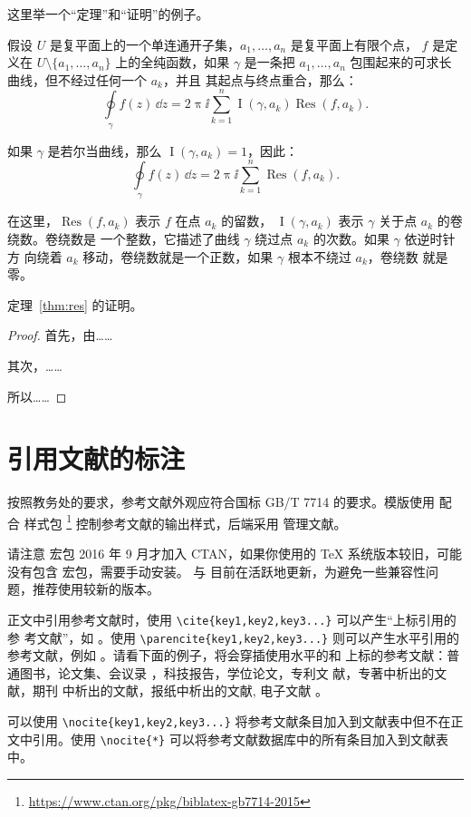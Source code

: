 这里举一个“定理”和“证明”的例子。
\begin{theorem}[留数定理]
\label{thm:res}
  假设 $U$ 是复平面上的一个单连通开子集，$a_1, \ldots, a_n$ 是复平面上有限个点，
  $f$ 是定义在 $U \setminus \{a_1, \ldots, a_n\}$ 上的全纯函数，如果 $\gamma$
  是一条把 $a_1, \ldots, a_n$ 包围起来的可求长曲线，但不经过任何一个 $a_k$，并且
  其起点与终点重合，那么：
  \begin{equation}
    \label{eq:res}
    \oint\limits_\gamma f(z)\, \dd z = 2\uppi \ii \sum_{k=1}^n \operatorname{I}(\gamma, a_k) \operatorname{Res}(f, a_k).
  \end{equation}

  如果 $\gamma$ 是若尔当曲线，那么 $\operatorname{I}(\gamma, a_k) = 1$，因此：
  \begin{equation}
    \label{eq:resthm}
    \oint\limits_\gamma f(z)\, \dd z = 2\uppi \ii \sum_{k=1}^n \operatorname{Res}(f, a_k).
  \end{equation}

  在这里，$\operatorname{Res}(f, a_k)$ 表示 $f$ 在点 $a_k$ 的留数，
  $\operatorname{I}(\gamma, a_k)$ 表示 $\gamma$ 关于点 $a_k$ 的卷绕数。卷绕数是
  一个整数，它描述了曲线 $\gamma$ 绕过点 $a_k$ 的次数。如果 $\gamma$ 依逆时针方
  向绕着 $a_k$ 移动，卷绕数就是一个正数，如果 $\gamma$ 根本不绕过 $a_k$，卷绕数
  就是零。

  定理~\ref{thm:res} 的证明。

  \begin{proof}
    首先，由……

    其次，……

    所以……
  \end{proof}
\end{theorem}

\section{引用文献的标注}

按照教务处的要求，参考文献外观应符合国标 GB/T 7714 的要求。模版使用 \BibLaTeX{}
配合  样式包%
\footnote{\url{https://www.ctan.org/pkg/biblatex-gb7714-2015}}%
控制参考文献的输出样式，后端采用  管理文献。

请注意  宏包 2016 年 9 月才加入 CTAN，如果你使用的
\TeX{} 系统版本较旧，可能没有包含  宏包，需要手动安装。
\BibLaTeX{} 与  目前在活跃地更新，为避免一些兼容性问
题，推荐使用较新的版本。

正文中引用参考文献时，使用 \verb|\cite{key1,key2,key3...}| 可以产生“上标引用的参
考文献”，如 \cite{Yu2001,Cheng1999,LSC1957}。使用
\verb|\parencite{key1,key2,key3...}| 则可以产生水平引用的参考文献，例如
\parencite{Li1999,Jiang1989,Hopkinson1999}。请看下面的例子，将会穿插使用水平的和
上标的参考文献：普通图书\parencite{Yu2001,Jiang1998}，论文集、会议录
\cite{CSTAM1990}，科技报告\parencite{WHO1970}，学位论文\cite{Zhang1998}，专利文
献\parencite{Jiang1989,HBLZ2001}，专著中析出的文献\cite{Cheng1999,GBT2659}，期刊
中析出的文献\parencite{Li1999,Li2000}，报纸中析出的文献\cite{Ding2000}, 电子文献
\parencite{Jiang1999,Christine1998,Xiao2001}。

可以使用 \verb|\nocite{key1,key2,key3...}| 将参考文献条目加入到文献表中但不在正
文中引用。使用 \verb|\nocite{*}| 可以将参考文献数据库中的所有条目加入到文献表
中。
\nocite{Yang1999,Schinstock2000,Wen1990,GBT16159}
